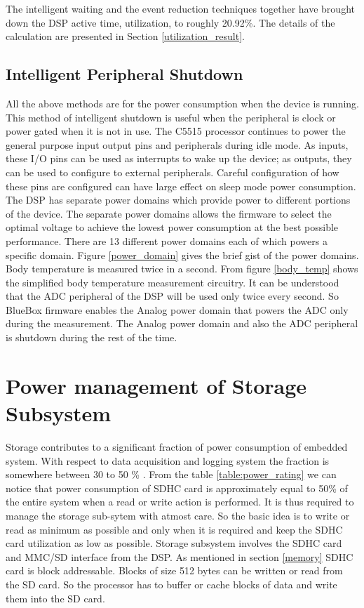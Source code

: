 The intelligent waiting and the event reduction techniques together
have brought down the DSP active time, utilization, to roughly
20.92\%. The details of the calculation are presented in Section
\ref{utilization_result}.

\subsection{Intelligent Peripheral Shutdown}

All the above methods are for the power consumption when the device
is running. This method of intelligent shutdown is useful when the
peripheral is clock or power gated when it is not in use. The C5515
processor continues to power the general purpose input output pins
and peripherals during idle mode. As inputs, these I/O pins can be
used as interrupts to wake up the device; as outputs, they can be
used to configure to external peripherals. Careful configuration of
how these pins are configured can have large effect on sleep mode
power consumption. The DSP has separate power domains which provide
power to different portions of the device. The separate power domains
allows the firmware to select the optimal voltage to achieve the
lowest power consumption at the best possible performance. There are
13 different power domains each of which powers a specific domain.
Figure \ref{power_domain} gives the brief gist of the power domains.
Body temperature is measured twice in a second. From figure
\ref{body_temp} shows the simplified body temperature measurement
circuitry. It can be understood that the ADC peripheral of the DSP
will be used only twice every second. So BlueBox firmware enables the
Analog power domain that powers the ADC only during the measurement.
The Analog power domain and also the ADC peripheral is shutdown
during the rest of the time. 

\section{Power management of Storage Subsystem}
Storage contributes to a significant fraction of power consumption of embedded system. With respect to data acquisition and logging system the fraction is somewhere between 30 to 50 \% . From the table \ref{table:power_rating} we can notice that power consumption of SDHC card is approximately equal to 50\% of the entire system when a read or write action is performed. It is thus required to manage the storage sub-sytem with atmost care. So the basic idea is to write or read as minimum as possible and only when it is required and keep the SDHC card utilization as low as possible.
Storage subsystem involves the SDHC card and MMC/SD interface from the DSP. As mentioned in section \ref{memory} SDHC card is block addressable. Blocks of size 512 bytes can be written or read from the SD card. So the processor has to buffer or cache blocks of data and write them into the SD card.  

